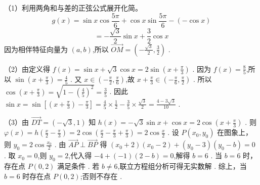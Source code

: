 \documentclass[12pt,UTF-8,a4paper]{ctexart}
\numberwithin{figure}{section}
\theoremstyle{mystyle}
\theoremstyle{mystylekaishu}
\theoremstyle{mystyle}
\numberwithin{xiti}{section}
\begin{document}
\begin{solutions}
（1）利用两角和与差的正弦公式展开化简。
$$
g(x)=\sin x\cos\frac{5\pi}{6}+\cos x\sin\frac{5\pi}{6}-(-\cos x)
$$
$$
=-\frac{\sqrt{3}}{2}\sin x+\frac{3}{2}\cos x
$$
因为相伴特征向量为 $(a,b)$,所以 $\overrightarrow{OM}=\left(-\frac{\sqrt{3}}{2}, \frac{3}{2}\right)$ .

（2）由定义得 $f(x)=\sin x+\sqrt{3}\cos x=2\sin\left(x+\frac{\pi}{3}\right)$ .
因为 $f(x)=\frac{8}{5}$,所以 $\sin\left(x+\frac{\pi}{3}\right)=\frac{4}{5}$ .
又 $x\in\left(-\frac{\pi}{2}, \frac{\pi}{6}\right)$,故 $x+\frac{\pi}{3}\in\left(-\frac{\pi}{6}, \frac{\pi}{2}\right)$ .
所以 $\cos\left(x+\frac{\pi}{3}\right)=\sqrt{1-\left(\frac{4}{5}\right)^2}=\frac{3}{5}$ .
因此 $\sin x=\sin\left[\left(x+\frac{\pi}{3}\right)-\frac{\pi}{3}\right]=\frac{4}{5}\times\frac{1}{2}-\frac{3}{5}\times\frac{\sqrt{3}}{2}=\frac{4-3\sqrt{3}}{10}$ .

（3）由 $\overrightarrow{DT}=(-\sqrt{3},1)$ 知 $h(x)=-\sqrt{3}\sin x+\cos x=2\cos\left(x+\frac{\pi}{3}\right)$ .
则 $\varphi(x)=h\left(\frac{x}{2}-\frac{\pi}{3}\right)=2\cos\left(\frac{x}{2}-\frac{\pi}{3}+\frac{\pi}{3}\right)=2\cos\frac{x}{2}$ .
设 $P(x_0,y_0)$ 在图象上，则 $y_0=2\cos\frac{x_0}{2}$ .
由 $\overrightarrow{AP}\perp\overrightarrow{BP}$ 得 $(x_0+2)(x_0-2)+(y_0-3)(y_0-b)=0$ .
取 $x_0=0$,则 $y_0=2$,代入得 $-4+(-1)(2-b)=0$,解得 $b=6$ .
当 $b=6$ 时，存在点 $P(0,2)$ 满足条件 .
若 $b\neq 6$,联立方程组分析可得无实数解 .
综上，当 $b=6$ 时存在点 $P(0,2)$;否则不存在 .
\end{solutions}
\end{document}
